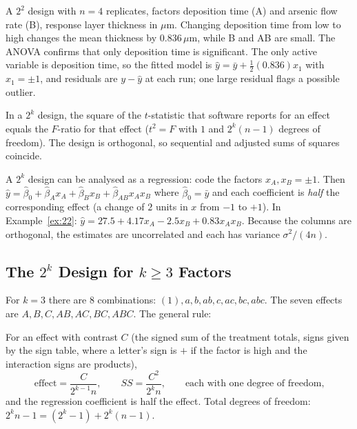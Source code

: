 \begin{example}
A $2^2$ design with $n=4$ replicates, factors deposition time (A) and arsenic flow rate (B), response layer thickness in $\mu$m. Changing deposition time from low to high changes the mean thickness by $0.836\,\mu$m, while B and AB are small. The ANOVA confirms that only deposition time is significant. The only active variable is deposition time, so the fitted model is $\hat{y}=\bar{y}+\tfrac12(0.836)x_1$ with $x_1=\pm1$, and residuals are $y-\hat{y}$ at each run; one large residual flags a possible outlier.
\end{example}

In a $2^k$ design, the square of the $t$-statistic that software reports for an effect equals the $F$-ratio for that effect ($t^2=F$ with $1$ and $2^k(n-1)$ degrees of freedom). The design is orthogonal, so sequential and adjusted sums of squares coincide.

A $2^k$ design can be analysed as a regression: code the factors $x_A,x_B=\pm1$. Then $\hat{y}=\hat\beta_0+\hat\beta_Ax_A+\hat\beta_Bx_B+\hat\beta_{AB}x_Ax_B$ where $\hat\beta_0=\bar{y}$ and each coefficient is \emph{half} the corresponding effect (a change of $2$ units in $x$ from $-1$ to $+1$). In Example~\ref{ex:22}: $\hat{y}=27.5+4.17x_A-2.5x_B+0.83x_Ax_B$. Because the columns are orthogonal, the estimates are uncorrelated and each has variance $\sigma^2/(4n)$.

\subsection{The $2^k$ Design for $k\ge3$ Factors}

For $k=3$ there are $8$ combinations: $(1),a,b,ab,c,ac,bc,abc$. The seven effects are $A,B,C,AB,AC,BC,ABC$. The general rule:

\begin{theorem}\label{thm:2k}
For an effect with contrast $C$ (the signed sum of the treatment totals, signs given by the sign table, where a letter's sign is $+$ if the factor is high and the interaction signs are products),
\[ \text{effect}=\frac{C}{2^{k-1}n},\qquad SS=\frac{C^2}{2^kn},\qquad\text{each with one degree of freedom,} \]
and the regression coefficient is half the effect. Total degrees of freedom: $2^kn-1=(2^k-1)+2^k(n-1)$.
\end{theorem}

